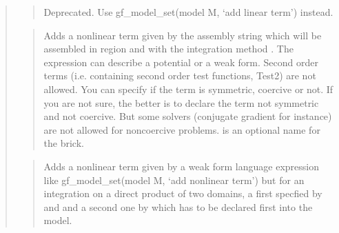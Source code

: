 \documentclass[a4paper,11pt,english]{sphinxmanual}
\begin{document}
\begin{quote}
\begin{quote}

Deprecated. Use gf\_model\_set(model M, ‘add linear term’) instead.
\end{quote}

\begin{quote}

Adds a nonlinear term given by the assembly string  which will
be assembled in region  and with the integration method .
The expression can describe a potential or a weak form. Second order
terms (i.e. containing second order test functions, Test2) are not
allowed.
You can specify if the term is symmetric, coercive or not.
If you are not sure, the better is to declare the term not symmetric
and not coercive. But some solvers (conjugate gradient for instance)
are not allowed for non\sphinxhyphen{}coercive problems.
 is an optional name for the brick.
\end{quote}

\begin{quote}

Adds a nonlinear term given by a weak form language expression like
gf\_model\_set(model M, ‘add nonlinear term’) but for an integration on a direct
product of two domains, a first specfied by  and 
and a second one by  which has to be declared
first into the model.
\end{quote}

\begin{quote}


\end{quote}
\end{quote}
\end{document}
